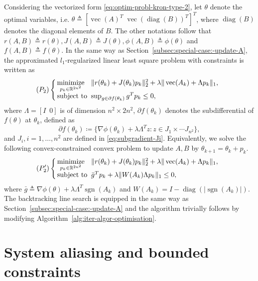 \documentclass[letterpaper,10pt,journal,final]{IEEEtran}
\theoremstyle{definition}
\theoremstyle{remark}
\newcommand{\diag}{\operatorname{diag}}
\newcommand{\kvec}{\operatorname{vec}}
\newcommand{\sgn}{\operatorname{sgn}}
\newcommand{\minimize}[1]{\underset{#1}{\operatorname{minimize}}}  \newcommand{\st}{\operatorname{subject\ to}}
\begin{document}
Considering the vectorized form \eqref{eq:optim-probl-kron-type-2}, let $\theta$
denote the optimal variables, i.e.
$\theta \triangleq [\kvec(A)^T\; \kvec(\diag(B))^T]^T$, where $\diag(B)$ denotes the
diagonal elements of $B$. The other notations follow that
$r(A,B) \triangleq r(\theta), J(A,B) \triangleq J(\theta), \phi(A,B) \triangleq
\phi(\theta)$ and $f(A,B) \triangleq f(\theta)$. In the same way as
Section~\ref{subsec:special-case:-update-A}, the approximated $l_1$-regularized
linear least square problem with constraints is written as
\begin{equation*}
  (P_2) \left\{
  \begin{array}{@{\,}l@{\;\;}l}
    \minimize{p_k \in \mathbb{R}^{2n^2}} &\|r(\theta_k) + J(\theta_k) p_k\|_2^2 + \lambda
                                           \|\kvec(A_k) + \Lambda p_k\|_1,\\
    \st & \sup_{g \in \partial f(\theta_k)} g^T p_k \leq 0,
  \end{array}
  \right.
\end{equation*}
where $\Lambda = [I\;\: 0]$ is of dimension $n^2\!\times\! 2n^2$, $\partial f(\theta_k)$ denotes the subdifferential of $f(\theta)$ at $\theta_k$, defined as
\begin{equation*}
  \partial f(\theta_k) \coloneqq \{ \nabla \phi(\theta_k) + \lambda \Lambda^T z : z \in J_1 \times \cdots J_{n^2} \},
\end{equation*}
and $J_i, i = 1,\dots,n^2$ are defined in \eqref{eq:subgradient-Ji}.
Equivalently, we solve the following convex-constrained convex problem to update $A, B$
by $\theta_{k+1} = \theta_{k} + p_k$.
\begin{equation*}
  (P_2') \left\{
  \begin{array}{@{\,}l@{\;\;}l}
    \minimize{p_k \in \mathbb{R}^{2n^2}} &\|r(\theta_k) + J(\theta_k) p_k\|_2^2 + \lambda
                                           \|\kvec(A_k) + \Lambda p_k\|_1,\\
    \st & \bar{g}^T p_k + \lambda \|W(A_k) \Lambda p_k\|_1 \leq 0,
  \end{array}
  \right.
\end{equation*}
where $\bar{g} \triangleq \nabla\phi(\theta) + \lambda \Lambda^T \sgn(A_k)$ and $W(A_k) = I - \diag(|\sgn(A_k)|)$.
The backtracking line search is equipped in the same way as
Section~\ref{subsec:special-case:-update-A} and the algorithm trivially follows by
modifying Algorithm~\ref{alg:iter-algor-optimisation}.


\section{System aliasing and bounded constraints}
\label{sec:syst-alias-bound-constraints}
\end{document}

